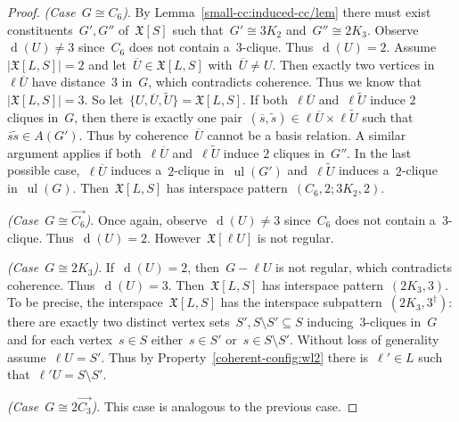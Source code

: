 \documentclass[english,a4paper]{article}
\theoremstyle{plain}
\theoremstyle{definition}
\newcommand{\abs}[1]{| #1 |}
\newcommand{\coherentConfig}{\ensuremath{\mathfrak{X}}}
\newcommand{\interspace}[2]{\ensuremath{\coherentConfig[#1,#2]}}
\newcommand{\inducedCC}[1]{\ensuremath{\coherentConfig[#1]}}
\newcommand{\intDegree}[1]{\ensuremath{\Deg \left( #1 \right)}}
\DeclareMathOperator*{\ul}{ul}
\newcommand{\arcs}{\ensuremath{A}}
\DeclareMathOperator{\Deg}{d}
\newcommand{\ipsixMatchingAndCycle}     {\ensuremath{(\cycle{6},2;\disjointCliques{3}{2},2)}}
\newcommand{\ipsixTriangle}               {\ensuremath{(\disjointCliques{2}{3},3^\dag)}}
\newcommand{\clique}[1]{\ensuremath{K_{#1}}}
\newcommand{\cycle}[1]{\ensuremath{C_{#1}}}
\newcommand{\disjointCliques}[2]{\ensuremath{#1 \clique{#2}}}
\begin{document}
\begin{proof}
    \textit{(Case~$G \cong C_6$)}.
    By Lemma~\ref{small-cc:induced-cc/lem} there must exist constituents~$G', G''$ of~$\inducedCC{S}$ such that~$G' \cong 3K_2$ and~$G'' \cong 2K_3$.
    Observe~$\intDegree{U} \neq 3$ since~$\cycle{6}$ does not contain a~$3$-clique.
    Thus~$\intDegree{U} = 2$.
    Assume~$\abs{\interspace{L}{S}} = 2$ and let~$\overline{U} \in \interspace{L}{S}$ with~$\overline{U} \neq U$.
    Then exactly two vertices in~$\ell \overline{U}$ have distance~$3$ in~$G$, which contradicts coherence.
    Thus we know that~$\abs{\interspace{L}{S}} = 3$.  So let~$\{U,\overline{U},\widetilde{U}\} = \interspace{L}{S}$.
    If both~$\ell \overline{U}$ and~$\ell \widetilde{U}$ induce $2$ cliques in~$G$, then there is exactly one pair~$(\overline{s},\widetilde{s}) \in \ell \overline{U} \times \ell \widetilde{U}$ such that~$\overline{s}\widetilde{s} \in \arcs(G')$.
    Thus by coherence~$\overline{U}$ cannot be a basis relation.
    A similar argument applies if both~$\ell \overline{U}$ and~$\ell \widetilde{U}$ induce $2$ cliques in~$G''$.
    In the last possible case,~$\ell \overline{U}$ induces a~$2$-clique in~$\ul(G')$ and~$\ell \widetilde{U}$ induces a~$2$-clique in~$\ul(G)$.
    Then~$\interspace{L}{S}$ has interspace pattern~$\ipsixMatchingAndCycle$.

    \textit{(Case~$G \cong \overrightarrow{C_6}$)}.
    Once again, observe~$\intDegree{U} \neq 3$ since~$\cycle{6}$ does not contain a~$3$-clique.
    Thus~$\intDegree{U} = 2$.
    However~$\inducedCC{\ell U}$ is not regular.

    \textit{(Case~$G \cong 2 K_3$)}.
    If~$\intDegree{U} = 2$, then~$G-\ell U$ is not regular, which contradicts coherence.     Thus~$\intDegree{U} = 3$. Then~$\interspace{L}{S}$ has interspace pattern~$(2K_3,3)$.
    To be precise, the interspace~$\interspace{L}{S}$ has the interspace subpattern~$\ipsixTriangle$:
    there are exactly two distinct vertex sets~$S',S \setminus S' \subseteq S$ inducing~$3$-cliques in~$G$ and for each vertex~$s \in S$ either~$s \in S'$ or~$s \in S \setminus S'$.
    Without loss of generality assume~$\ell U  = S'$.
    Thus by Property~\ref{coherent-config:wl2} there is~$\ell' \in L$ such that~$\ell' U = S \setminus S'$.

    \textit{(Case~$G \cong 2\overrightarrow{C_3}$)}.
    This case is analogous to the previous case.


\end{proof}
\end{document}
